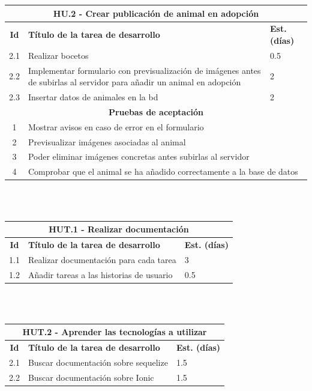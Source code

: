 \begin{tabular}{|c|p{9.5cm}|p{1cm}|}
	\hline
	\multicolumn{3}{|c|}{\textbf{HU.2 - Crear publicación de animal en adopción}} \\
	\hline
	\textbf{Id} & \textbf{Título de la tarea de desarrollo} & \textbf{Est. (días)} \\ %
	\hline
	2.1 & Realizar bocetos & 0.5 \\ \hline
	2.2 &  Implementar formulario con previsualización de imágenes antes de subirlas al servidor para añadir un animal en adopción & 2 \\ \hline
	2.3 &  Insertar datos de animales en la bd & 2 \\ \hline 
	\multicolumn{3}{|c|}{\textbf{Pruebas de aceptación}} \\ \hline
	1 & \multicolumn{2}{|l|}{Mostrar avisos en caso de error en el formulario} \\ \hline
	2 & \multicolumn{2}{|l|}{Previsualizar imágenes asociadas al animal} \\ \hline
	3 & \multicolumn{2}{|l|}{Poder eliminar imágenes concretas antes subirlas al servidor} \\\hline
	4 & \multicolumn{2}{|l|}{Comprobar que el animal se ha añadido correctamente a la base de datos} \\\hline
	
\end{tabular} \\ \\


\begin{tabular}{|c|p{9.5cm}|p{1cm}|}
	\hline
	\multicolumn{3}{|c|}{\textbf{HUT.1 - Realizar documentación}} \\
	\hline
	\textbf{Id} & \textbf{Título de la tarea de desarrollo} & \textbf{Est. (días)} \\
	\hline
	1.1 & Realizar documentación para cada tarea & 3 \\ \hline
	1.2 &  Añadir tareas a las historias de usuario & 0.5 \\ \hline
\end{tabular} \\ \\

\begin{tabular}{|c|p{9.5cm}|p{1cm}|}
	\hline
	\multicolumn{3}{|c|}{\textbf{HUT.2 - Aprender las tecnologías a utilizar}} \\
	\hline
	\textbf{Id} & \textbf{Título de la tarea de desarrollo} & \textbf{Est. (días)} \\
	\hline
	2.1 & Buscar documentación sobre sequelize & 1.5 \\ \hline
	2.2 & Buscar documentación sobre Ionic & 1.5 \\ \hline
\end{tabular} \\ \\


